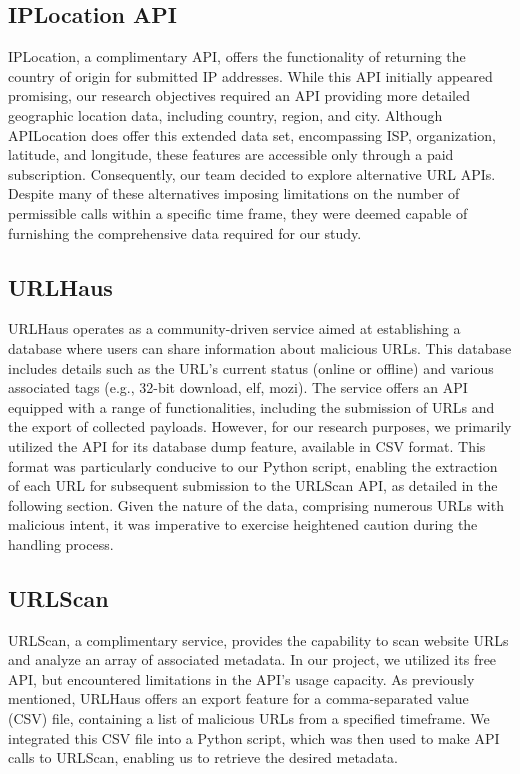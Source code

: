 \documentclass[letterpaper, 10 pt, conference]{ieeeconf}  %
\begin{document}
    \subsection*{IPLocation API}
    IPLocation, a complimentary API, offers the functionality of returning the country of origin for submitted IP addresses. While this API initially appeared promising, our research objectives required an API providing more detailed geographic location data, including country, region, and city. 
    Although APILocation does offer this extended data set, encompassing ISP, organization, latitude, and longitude, these features are accessible only through a paid subscription. Consequently, our team decided to explore alternative URL APIs. 
    Despite many of these alternatives imposing limitations on the number of permissible calls within a specific time frame, they were deemed capable of furnishing the comprehensive data required for our study.
    
    \subsection*{URLHaus}
    URLHaus operates as a community-driven service aimed at establishing a database where users can share information about malicious URLs. This database includes details such as the URL's current status (online or offline) and various associated tags (e.g., 32-bit download, elf, mozi). The service offers an API equipped with a range of functionalities, including the submission of URLs and the export of collected payloads. However, for our research purposes, we primarily utilized the API for its database dump feature, available in CSV format. This format was particularly conducive to our Python script, enabling the extraction of each URL for subsequent submission to the URLScan API, as detailed in the following section. Given the nature of the data, comprising numerous URLs with malicious intent, it was imperative to exercise heightened caution during the handling process.
    
    \subsection*{URLScan}
    URLScan, a complimentary service, provides the capability to scan website URLs and analyze an array of associated metadata. In our project, we utilized its free API, but encountered limitations in the API's usage capacity. As previously mentioned, URLHaus offers an export feature for a comma-separated value (CSV) file, containing a list of malicious URLs from a specified timeframe. We integrated this CSV file into a Python script, which was then used to make API calls to URLScan, enabling us to retrieve the desired metadata.
\end{document}
